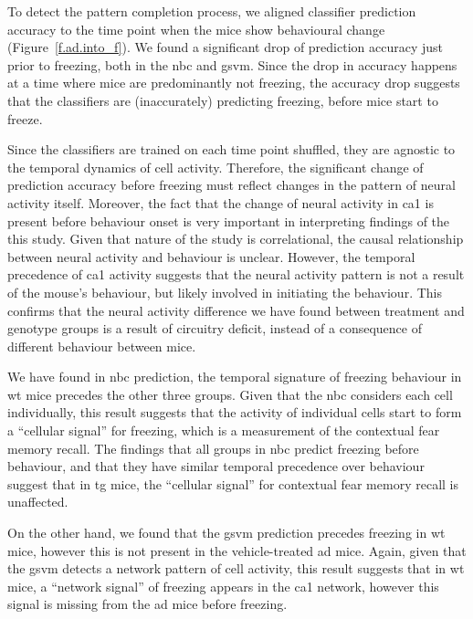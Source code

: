 To detect the pattern completion process, we aligned classifier prediction accuracy to the time point when the mice show behavioural change (Figure~\ref{f.ad.into_f}). We found a significant drop of prediction accuracy just prior to freezing, both in the \gls{nbc} and \gls{gsvm}. Since the drop in accuracy happens at a time where mice are predominantly not freezing, the accuracy drop suggests that the classifiers are (inaccurately) predicting freezing, before mice start to freeze. 

Since the classifiers are trained on each time point shuffled, they are agnostic to the temporal dynamics of cell activity. Therefore, the significant change of prediction accuracy before freezing must reflect changes in the pattern of neural activity itself. Moreover, the fact that the change of neural activity in \gls{ca1} is present before behaviour onset is very important in interpreting findings of the this study. Given that nature of the study is correlational, the causal relationship between neural activity and behaviour is unclear. However, the temporal precedence of \gls{ca1} activity suggests that the neural activity pattern is not a result of the mouse's behaviour,  but likely involved in initiating the behaviour. This confirms that the neural activity difference we have found between treatment and genotype groups is a result of circuitry deficit, instead of a consequence of different behaviour between mice. 

We have found in \gls{nbc} prediction, the temporal signature of freezing behaviour in \gls{wt} mice precedes the other three groups. Given that the \gls{nbc} considers each cell individually, this result suggests that the activity of individual cells start to form a ``cellular signal'' for freezing, which is a measurement of the contextual fear memory recall. The findings that all groups in \gls{nbc} predict freezing before behaviour, and that they have similar temporal precedence over behaviour suggest that in \gls{tg} mice, the ``cellular signal'' for contextual fear memory recall is unaffected. 

On the other hand, we found that the \gls{gsvm} prediction precedes freezing in \gls{wt} mice, however this is not present in the vehicle-treated \gls{ad} mice. Again, given that the \gls{gsvm} detects a network pattern of cell activity, this result suggests that in \gls{wt} mice, a ``network signal'' of freezing appears in the \gls{ca1} network, however this signal is missing from the \gls{ad} mice before freezing. 

